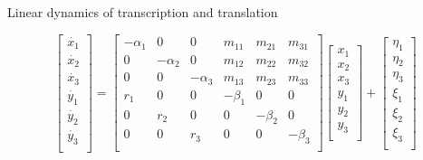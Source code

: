 \documentclass[aspectratio=1610]{beamer}					%
\begin{document}
\begin{frame}{Linear dynamics of transcription and translation}
\begin{textblock*}{15cm}
\begin{equation*}
\begin{bmatrix} 
    \dot{x_{1}}\\
	\dot{x_{2}}\\
	\dot{x_{3}}\\
    \dot{y_{1}}\\
	\dot{y_{2}}\\
	\dot{y_{3}}\\
    \end{bmatrix}
    =
\begin{bmatrix} 
    -\alpha_{1} & 0 & 0 & m_{11} & m_{21} & m_{31} \\
	0 & -\alpha_{2} & 0 & m_{12} & m_{22} & m_{32}\\
	0 & 0 & -\alpha_{3} & m_{13} & m_{23} & m_{33} \\
    r_{1} & 0 & 0 & -\beta_{1}  & 0 & 0 \\
	0 & r_{2} & 0 & 0  & -\beta_{2} & 0 \\
	0 & 0 & r_{3} & 0 & 0 & -\beta_{3}  \\
\end{bmatrix}
\begin{bmatrix} 
    x_{1}\\
	x_{2}\\
	x_{3}\\
    y_{1}\\
	y_{2}\\
	y_{3}\\
    \end{bmatrix}
+ 
\begin{bmatrix} 
    \eta_{1}\\
	\eta_{2}\\
	\eta_{3}\\
    \xi_{1}\\
	\xi_{2}\\
	\xi_{3}\\
    \end{bmatrix}
\end{equation*}

\end{textblock*}

\end{frame}
\end{document}
